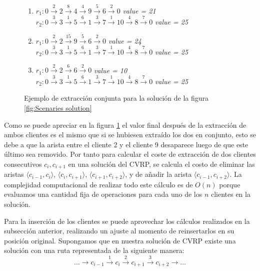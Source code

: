 \documentclass{article}
\begin{document}
\begin{figure}[h]
	\begin{enumerate}
		\item 	
		$r_1:0 \xrightarrow{2} 2 \xrightarrow{8} 4 \xrightarrow{4} 9 \xrightarrow{5} 6 \xrightarrow{2} 0$ \textit{value = 21}\\
		$r_2:0 \xrightarrow{3} 3 \xrightarrow{1} 5 \xrightarrow{6} 1 \xrightarrow{3} 7 \xrightarrow{1} 10 \xrightarrow{4} 8 \xrightarrow{7} 0$ \textit{value = 25}\\
		\item
		$r_1:0 \xrightarrow{2} 2 \xrightarrow{15} 9 \xrightarrow{5} 6 \xrightarrow{2} 0$ \textit{value = 24}\\
		$r_2:0 \xrightarrow{3} 3 \xrightarrow{1} 5 \xrightarrow{6} 1 \xrightarrow{3} 7 \xrightarrow{1} 10 \xrightarrow{4} 8 \xrightarrow{7} 0$ \textit{value = 25}\\
		\item 
		$r_1:0 \xrightarrow{2} 2 \xrightarrow{6} 6 \xrightarrow{2} 0$ \textit{value = 10}\\
		$r_2:0 \xrightarrow{3} 3 \xrightarrow{1} 5 \xrightarrow{6} 1 \xrightarrow{3} 7 \xrightarrow{1} 10 \xrightarrow{4} 8 \xrightarrow{7} 0$ \textit{value = 25}\\
	\end{enumerate}

	\caption{Ejemplo de extracción conjunta para la solución de la figura \ref{fig:Scenaries solution}}
	\label{fig:extract_together}
\end{figure} 

Como se puede apreciar en la figura \ref{fig:extract_together} el valor final después de la extracción de ambos clientes es el mismo que si se hubiesen extraído los dos en conjunto, esto se debe a que la arista entre el cliente 2 y el cliente 9 desaparece luego de que este último sea removido. Por tanto para calcular el coste de extracción de dos clientes consecutivos $c_i,c_{i+1}$ en una solución del CVRP, se calcula el costo de eliminar las aristas $\langle c_{i-1},c_i \rangle$, $\langle c_i,c_{i+1} \rangle$, $\langle c_{i+1},c_{i+2} \rangle$, y de añadir la arista $\langle c_{i-1},c_{i+2} \rangle$. La complejidad computacional de realizar todo este cálculo es de $O(n)$ porque evaluamos una cantidad fija de operaciones para cada uno de los $n$ clientes en la solución.

Para la inserción de los clientes se puede aprovechar los cálculos realizados en la subsección anterior, realizando un ajuste al momento de reinsertarlos en su  posición original. Supongamos que en nuestra solución de CVRP existe una solución con una ruta representada de la siguiente manera:
\[
... \rightarrow c_{i-1} \xrightarrow{1} c_i \xrightarrow{2} c_{i+1} \xrightarrow{3} c_{i+2} \rightarrow ...
 \]
 
\end{document}
